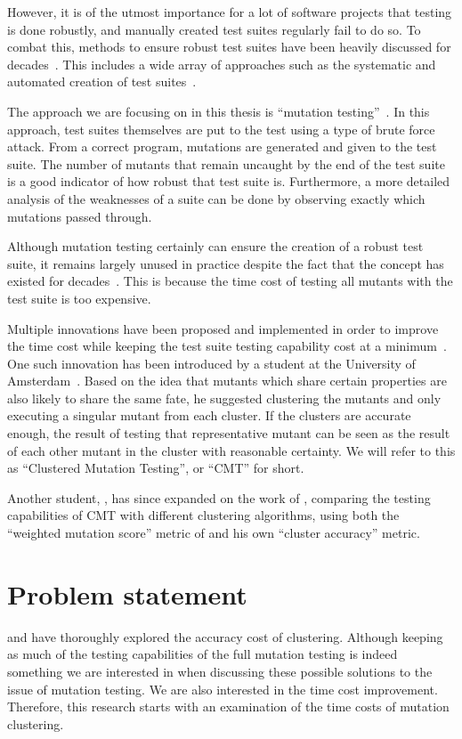 \documentclass[twoside]{uva-inf-bachelor-thesis}
\begin{document}
However, it is of the utmost importance for a lot of software projects that testing is done robustly, and manually created test suites regularly fail to do so. To combat this, methods to ensure robust test suites have been heavily discussed for decades~\cite{Harrold00}. This includes a wide array of approaches such as the systematic and automated creation of test suites~\cite{Fraser13}.

The approach we are focusing on in this thesis is ``mutation testing''~\cite{Jia11}. In this approach, test suites themselves are put to the test using a type of brute force attack. From a correct program, mutations are generated and given to the test suite. The number of mutants that remain uncaught by the end of the test suite is a good indicator of how robust that test suite is. Furthermore, a more detailed analysis of the weaknesses of a suite can be done by observing exactly which mutations passed through.

Although mutation testing certainly can ensure the creation of a robust test suite, it remains largely unused in practice despite the fact that the concept has existed for decades~\cite{Jia11}. This is because the time cost of testing all mutants with the test suite is too expensive.

Multiple innovations have been proposed and implemented in order to improve the time cost while keeping the test suite testing capability cost at a minimum~\cite{Zhang16, Basarat21}. One such innovation has been introduced by a student at the University of Amsterdam~\cite{Basarat21}. Based on the idea that mutants which share certain properties are also likely to share the same fate, he suggested clustering the mutants and only executing a singular mutant from each cluster. If the clusters are accurate enough, the result of testing that representative mutant can be seen as the result of each other mutant in the cluster with reasonable certainty. We will refer to this as ``Clustered Mutation Testing'', or ``CMT'' for short.

Another student, \textcite{Mouissie22}, has since expanded on the work of \textcite{Basarat21}, comparing the testing capabilities of CMT with different clustering algorithms, using both the ``weighted mutation score'' metric of \textcite{Basarat21} and his own ``cluster accuracy'' metric.

\section{Problem statement}
\textcite{Basarat21} and \textcite{Mouissie22} have thoroughly explored the accuracy cost of clustering. Although keeping as much of the testing capabilities of the full mutation testing is indeed something we are interested in when discussing these possible solutions to the issue of mutation testing. We are also interested in the time cost improvement. Therefore, this research starts with an examination of the time costs of mutation clustering.
\end{document}
